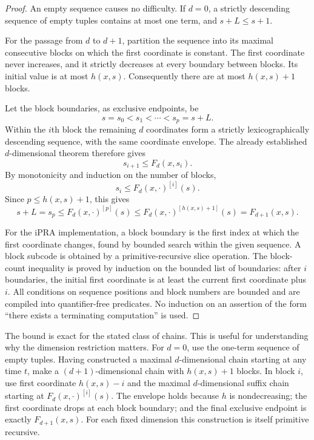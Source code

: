 \begin{proof}
An empty sequence causes no difficulty.  If $d=0$, a strictly descending
sequence of empty tuples contains at most one term, and $s+L\le s+1$.

For the passage from $d$ to $d+1$, partition the sequence into its
maximal consecutive blocks on which the first coordinate is constant.
The first coordinate never increases, and it strictly decreases at
every boundary between blocks.  Its initial value is at most $h(x,s)$.
Consequently there are at most $h(x,s)+1$ blocks.

Let the block boundaries, as exclusive endpoints, be
\[
 s=s_0<s_1<\cdots<s_p=s+L.
\]
Within the $i$th block the remaining $d$ coordinates form a strictly
lexicographically descending sequence, with the same coordinate envelope.
The already established $d$-dimensional theorem therefore gives
\[
                         s_{i+1}\le F_d(x,s_i).
\]
By monotonicity and induction on the number of blocks,
\[
 s_i\le F_d(x,\cdot)^{[i]}(s).
\]
Since $p\le h(x,s)+1$, this gives
\[
 s+L=s_p
 \le F_d(x,\cdot)^{[p]}(s)
 \le F_d(x,\cdot)^{[h(x,s)+1]}(s)
 =F_{d+1}(x,s).
\]

For the iPRA implementation, a block boundary is the first index at
which the first coordinate changes, found by bounded search within the
given sequence.  A block subcode is obtained by a primitive-recursive
slice operation.  The block-count inequality is proved by induction on
the bounded list of boundaries: after $i$ boundaries, the initial first
coordinate is at least the current first coordinate plus $i$.  All
conditions on sequence positions and block numbers are bounded and are
compiled into quantifier-free predicates.  No induction on an assertion
of the form ``there exists a terminating computation'' is used.
\end{proof}

The bound is exact for the stated class of chains.  This is useful for
understanding why the dimension restriction matters.  For $d=0$, use the
one-term sequence of empty tuples.  Having constructed a maximal
$d$-dimensional chain starting at any time $t$, make a $(d+1)$-dimensional
chain with $h(x,s)+1$ blocks.  In block $i$, use first coordinate
$h(x,s)-i$ and the maximal $d$-dimensional suffix chain starting at
$F_d(x,\cdot)^{[i]}(s)$.  The envelope holds because $h$ is nondecreasing;
the first coordinate drops at each block boundary; and the final
exclusive endpoint is exactly $F_{d+1}(x,s)$.  For each fixed dimension
this construction is itself primitive recursive.

